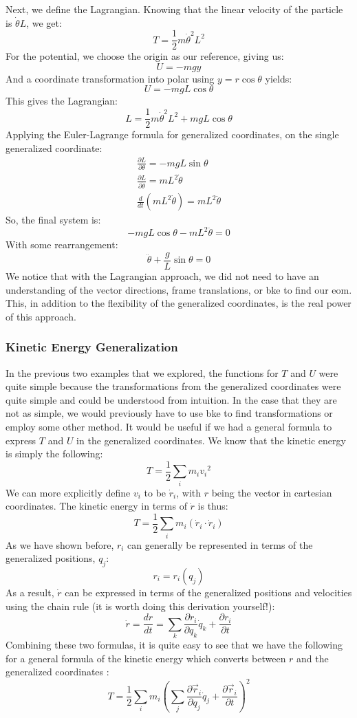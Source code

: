 Next, we define the \gls{Lagrangian}. Knowing that the linear velocity of the particle is $\dot{\theta}L$, we get:
$$T=\frac{1}{2}m\dot{\theta}^2L^2$$
For the potential, we choose the origin as our reference, giving us:
$$U=-mgy$$
And a coordinate transformation into polar using $y=r\cos\theta$ yields:
$$U=-mgL\cos\theta$$
This gives the \gls{Lagrangian}:
$$L=\frac{1}{2}m\dot{\theta}^2L^2+mgL\cos\theta$$
Applying the Euler-Lagrange formula for generalized coordinates,  on the single generalized coordinate:
\begin{gather}
    \frac{\partial L}{\partial \theta}=-mgL\sin\theta\\
    \frac{\partial L}{\partial \dot{\theta}}=mL^2\dot{\theta}\\
    \frac{d}{dt}\left(mL^2\dot{\theta}\right)=mL^2\ddot{\theta}
\end{gather}
So, the final system is:
$$-mgL\cos\theta -mL^2\ddot{\theta}=0$$
With some rearrangement:
$$\ddot{\theta}+\frac{g}{L}\sin\theta=0$$
We notice that with the \gls{Lagrangian} approach, we did not need to have an understanding of the vector directions, frame translations, or \gls{bke} to find our \gls{eom}. This, in addition to the flexibility of the generalized coordinates, is the real power of this approach.

\subsubsection{Kinetic Energy Generalization}
In the previous two examples that we explored, the functions for $T$ and $U$ were quite simple because the transformations from the generalized coordinates were quite simple and could be understood from intuition. In the case that they are not as simple, we would previously have to use \gls{bke} to find transformations or employ some other method. It would be useful if we had a general formula to express $T$ and $U$ in the generalized coordinates. We know that the kinetic energy is simply the following:
$$T=\frac{1}{2}\sum_im_i{v_i}^2$$
We can more explicitly define $v_i$ to be $\dot{r}_i$, with $r$ being the vector in cartesian coordinates. The kinetic energy in terms of $\dot{r}$ is thus:
$$T=\frac{1}{2}\sum_im_i(\dot{r}_i\cdot\dot{r}_i)$$
As we have shown before, $r_i$ can generally be represented in terms of the generalized positions, $q_j$:
$$r_i=r_i(q_j)$$
As a result, $\dot{r}$ can be expressed in terms of the generalized positions and velocities using the chain rule (it is worth doing this derivation yourself!):
$$\dot{r}=\frac{dr}{dt}=\sum_k{\frac{\partial r_i}{\partial q_k}\dot{q}_k+\frac{\partial r_i}{\partial t}}$$
Combining these two formulas, it is quite easy to see that we have the following for a general formula of the kinetic energy which converts between $r$ and the generalized coordinates :
$$T=\frac{1}{2}\sum_im_i\left(\sum_j\frac{\partial\vec{r}_i}{\partial q_j}\dot{q}_j+\frac{\partial \vec{r}_i}{\partial t}\right)^2$$

